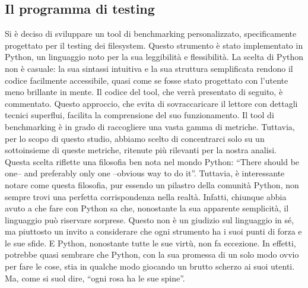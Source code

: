 \subsection{Il programma di testing}
Si è deciso di sviluppare un tool di benchmarking personalizzato, specificamente progettato per il testing dei filesystem. Questo strumento è stato implementato in Python, un linguaggio noto per la sua leggibilità e flessibilità. La scelta di Python non è casuale: la sua sintassi intuitiva e la sua struttura semplificata rendono il codice facilmente accessibile, quasi come se fosse stato progettato con l’utente meno brillante in mente. Il codice del tool, che verrà presentato di seguito, è commentato. Questo approccio, che evita di sovraccaricare il lettore con dettagli tecnici superflui, facilita la comprensione del suo funzionamento. Il tool di benchmarking è in grado di raccogliere una vasta gamma di metriche. Tuttavia, per lo scopo di questo studio, abbiamo scelto di concentrarci solo su un sottoinsieme di queste metriche, ritenute più rilevanti per la nostra analisi. Questa scelta riflette una filosofia ben nota nel mondo Python: “There should be one-- and preferably only one --obvious way to do it”. Tuttavia, è interessante notare come questa filosofia, pur essendo un pilastro della comunità Python, non sempre trovi una perfetta corrispondenza nella realtà. Infatti, chiunque abbia avuto a che fare con Python sa che, nonostante la sua apparente semplicità, il linguaggio può riservare sorprese. Questo non è un giudizio sul linguaggio in sé, ma piuttosto un invito a considerare che ogni strumento ha i suoi punti di forza e le sue sfide. E Python, nonostante tutte le sue virtù, non fa eccezione. In effetti, potrebbe quasi sembrare che Python, con la sua promessa di un solo modo ovvio per fare le cose, stia in qualche modo giocando un brutto scherzo ai suoi utenti. Ma, come si suol dire, “ogni rosa ha le sue spine”.
